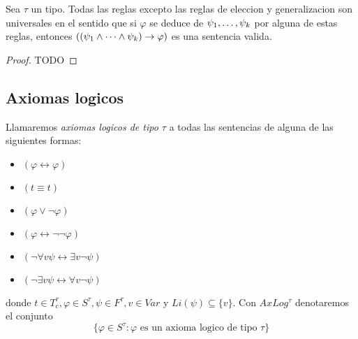 \begin{lemma}
  Sea $\tau$ un tipo. Todas las reglas excepto las reglas de eleccion y generalizacion son universales en el sentido que si $\varphi$ se deduce de $\succession{\psi}{1}{k}$ por alguna de estas reglas,
  entonces $((\succession[\land]{\psi}{1}{k})\rightarrow\varphi)$ es una sentencia valida.
\end{lemma}
\begin{proof}
  TODO
\end{proof}

\subsection{Axiomas logicos}
\begin{definition}
  Llamaremos \emph{axiomas logicos de tipo $\tau$} a todas las sentencias de alguna de las siguientes formas:
  \begin{itemize}
    \item $(\varphi\leftrightarrow\varphi)$
    \item $(t\equiv t)$
    \item $(\varphi\lor\neg\varphi)$
    \item $(\varphi\leftrightarrow\neg\neg\varphi)$
    \item $(\neg\forall v\psi\leftrightarrow\exists v\neg\psi)$
    \item $(\neg\exists v\psi\leftrightarrow\forall v\neg\psi)$
  \end{itemize}
  donde $t \in T_c^\tau, \varphi\in S^\tau, \psi\in F^\tau, v\in Var$ y $Li(\psi) \subseteq \{v\}$. Con $AxLog^\tau$ denotaremos el conjunto
  $$
  \{\varphi \in S^\tau : \varphi \text{ es un axioma logico de tipo } \tau\}
  $$
\end{definition}

